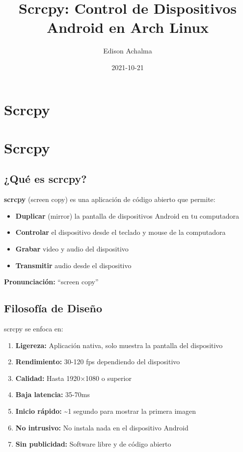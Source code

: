 \documentclass[
  doc,
  floatsintext,
  longtable,
  a4paper,
  nolmodern,
  notxfonts,
  notimes,
  12pt,
  colorlinks=true,linkcolor=blue,citecolor=blue,urlcolor=blue]{apa7}
\title{Scrcpy: Control de Dispositivos Android en Arch Linux}
\author{Edison Achalma}
\affiliation{
{Escuela Profesional de Economía, Universidad Nacional de San Cristóbal
de Huamanga}}
\date{2021-10-21}
\providecommand{\tightlist}{%
  \setlength{\itemsep}{0pt}\setlength{\parskip}{0pt}}
\begin{document}
\maketitle


\hypertarget{toc}{}
\tableofcontents
\newpage
\section[Introduction]{Scrcpy}

\setcounter{secnumdepth}{3}

\setlength\LTleft{0pt}




\section{Scrcpy}\label{scrcpy}

\subsection{¿Qué es scrcpy?}\label{quuxe9-es-scrcpy}

\textbf{scrcpy} (screen copy) es una aplicación de código abierto que
permite:

\begin{itemize}
\tightlist
\item
  \textbf{Duplicar} (mirror) la pantalla de dispositivos Android en tu
  computadora
\item
  \textbf{Controlar} el dispositivo desde el teclado y mouse de la
  computadora
\item
  \textbf{Grabar} video y audio del dispositivo
\item
  \textbf{Transmitir} audio desde el dispositivo
\end{itemize}

\textbf{Pronunciación:} ``screen copy''

\subsection{Filosofía de Diseño}\label{filosofuxeda-de-diseuxf1o}

scrcpy se enfoca en:

\begin{enumerate}
\def\labelenumi{\arabic{enumi}.}
\tightlist
\item
  \textbf{Ligereza:} Aplicación nativa, solo muestra la pantalla del
  dispositivo
\item
  \textbf{Rendimiento:} 30-120 fps dependiendo del dispositivo
\item
  \textbf{Calidad:} Hasta 1920×1080 o superior
\item
  \textbf{Baja latencia:} 35-70ms
\item
  \textbf{Inicio rápido:} \textasciitilde1 segundo para mostrar la
  primera imagen
\item
  \textbf{No intrusivo:} No instala nada en el dispositivo Android
\item
  \textbf{Sin publicidad:} Software libre y de código abierto
\end{enumerate}
\end{document}
